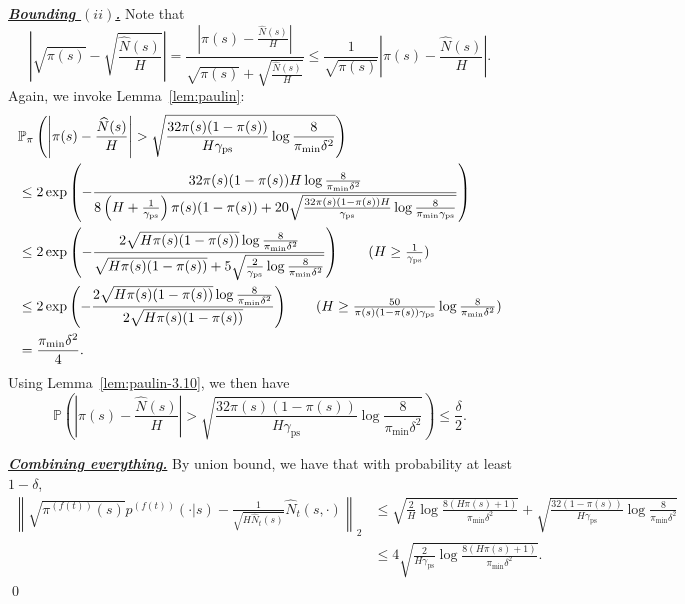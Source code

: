 \documentclass[twoside]{article}
\def\sP{{\mathbb{P}}}
\theoremstyle{plain}
\def\bignorm#1{\left\lVert #1 \right\rVert}
\def\bigabs#1{\left| #1 \right|}
\newcommand{\ps}{\mathrm{ps}}
\begin{document}
\underline{\textbf{\textit{Bounding $(ii)$.}}}
Note that
\begin{equation*}
	\bigabs{\sqrt{\pi(s)} - \sqrt{\frac{\widehat{N}(s)}{H}}} = \frac{\bigabs{\pi(s) - \frac{\widehat{N}(s)}{H}}}{\sqrt{\pi(s)} + \sqrt{\frac{\widehat{N}(s)}{H}}}
	\leq \frac{1}{\sqrt{\pi(s)}} \bigabs{\pi(s) - \frac{\widehat{N}(s)}{H}}.
\end{equation*}
Again, we invoke Lemma~\ref{lem:paulin}:
\begin{align*}
	&\sP_\pi\left( \bigabs{\pi(s) - \frac{\widehat{N}(s)}{H}} > \sqrt{\frac{32 \pi(s) (1 - \pi(s))}{H \gamma_\ps} \log\frac{8}{\pi_{\min} \delta^2}} \right) \\
	&\leq 2 \exp\left( - \frac{32 \pi(s) (1 - \pi(s)) H \log\frac{8}{\pi_{\min}\delta^2}}{8 \left( H + \frac{1}{\gamma_\ps} \right) \pi(s) (1 - \pi(s)) + 20 \sqrt{\frac{32 \pi(s) (1 - \pi(s)) H}{\gamma_\ps} \log\frac{8}{\pi_{\min} \gamma_\ps} }} \right) \\
	&\leq 2 \exp\left( - \frac{2 \sqrt{H \pi(s) (1 - \pi(s))} \log\frac{8}{\pi_{\min}\delta^2}}{\sqrt{H \pi(s) (1 - \pi(s))} + 5 \sqrt{\frac{2}{\gamma_\ps} \log\frac{8}{\pi_{\min} \delta^2}}} \right) \tag{$H \geq \frac{1}{\gamma_\ps}$} \\
	&\leq 2 \exp\left( - \frac{2 \sqrt{H \pi(s) (1 - \pi(s))} \log\frac{8}{\pi_{\min}\delta^2}}{2 \sqrt{H \pi(s) (1 - \pi(s))}} \right) \tag{$H \geq \frac{50}{\pi(s) (1 - \pi(s)) \gamma_\ps} \log\frac{8}{\pi_{\min} \delta^2}$} \\
	&= \frac{\pi_{\min} \delta^2}{4}.
\end{align*}
Using Lemma~\ref{lem:paulin-3.10}, we then have
\begin{equation}
\label{eqn:pi-concentration}
	\sP\left( \bigabs{\pi(s) - \frac{\widehat{N}(s)}{H}} > \sqrt{\frac{32 \pi(s) (1 - \pi(s))}{H \gamma_\ps} \log\frac{8}{\pi_{\min} \delta^2}} \right) \leq \frac{\delta}{2}.
\end{equation}

\underline{\textbf{\textit{Combining everything.}}}
By union bound, we have that with probability at least $1 - \delta$,
\begin{align}
	\bignorm{\sqrt{\pi^{(f(t))}(s)} p^{(f(t))}(\cdot | s) - \frac{1}{\sqrt{H \widehat{N}_t(s)}} \widehat{N}_t(s, \cdot)}_2 \nonumber &\leq \sqrt{\frac{2}{H} \log\frac{8(H\pi(s) + 1)}{\pi_{\min} \delta^2}} + \sqrt{\frac{32 (1 - \pi(s))}{H \gamma_\ps} \log\frac{8}{\pi_{\min} \delta^2}} \nonumber \\
	&\leq 4 \sqrt{\frac{2}{H \gamma_\ps} \log\frac{8 (H \pi(s) + 1)}{\pi_{\min} \delta^2}}.
\end{align}
\qed
\end{document}
